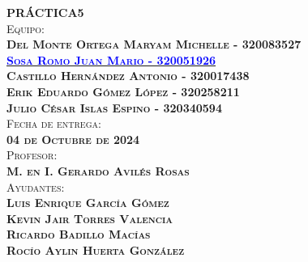 \begin{titlepage}
\begin{minipage}[c][0.81\textheight][t]{0.75\textwidth}
\begin{center}
			\textsc{\LARGE \textbf{P}\hspace{1cm}\textbf{R}\hspace{1cm}\textbf{Á}\hspace{1cm}\textbf{C}\hspace{1cm}\textbf{T}\hspace{1cm}\textbf{I}\hspace{1cm}\textbf{C}\hspace{1cm}\textbf{A}\hspace{1.3cm}\textbf{5}}\\[2cm]
			\textsc{\Large{Equipo:}\normalsize \\
                \vspace{.3cm}
				\textbf{Del Monte Ortega Maryam Michelle - 320083527 \\
                \vspace{.2cm}
				\href{https://github.com/JuanSosaCiencias}{\textcolor{blue}{Sosa Romo Juan Mario - 320051926}} \\
                \vspace{.2cm}
				Castillo Hernández Antonio - 320017438 \\
                \vspace{.2cm}
                Erik Eduardo Gómez López - 320258211 \\
                \vspace{.2cm}
                Julio César Islas Espino - 320340594}}\\[0.5cm]     
			
			\textsc{{Fecha de entrega: \\ \textbf{04 de Octubre de 2024}}}\\[0.5cm]        
			
			\textsc{{Profesor: \\ \textbf{M. en I. Gerardo Avilés Rosas}}}\\[0.5cm]  
			
			\textsc{Ayudantes: \\ \textbf{Luis Enrique García Gómez \\ Kevin Jair Torres Valencia \\ Ricardo Badillo Macías \\ Rocío Aylin Huerta González
			} }
			
			
			\vspace{0.5cm}
		\end{center}
	\end{minipage}
\end{titlepage}
